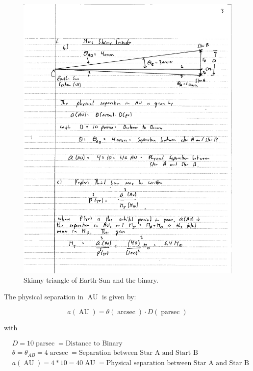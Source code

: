 \documentclass[11pt]{scrartcl}
\DeclareMathOperator{\AU}{AU}
\DeclareMathOperator{\arcsec}{arcsec}
\DeclareMathOperator{\parsec}{parsec}
\begin{document}
\begin{figure}[H]
\centering
\includegraphics[width=\textwidth]{figures/problem-set-2-earth-binary-2.pdf}
\caption{Skinny triangle of Earth-Sun and the binary.}
\end{figure}

The physical separation in $\AU$ is given by:

\[a(\AU) = \theta(\arcsec) \cdot D(\parsec)\]

with

\begin{align*}
&D = 10 \parsec = \text{Distance to Binary} \\
&\theta = \theta_{AB} = 4\arcsec = \text{Separation between Star A and Start B} \\
&a(\AU) = 4 * 10 = 40 \AU = \text{Physical separation between Star A and Star B}
\end{align*}

\subsection{}
\end{document}
